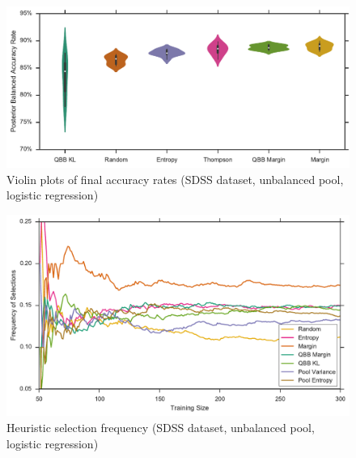 \begin{figure}[p]
	\centering
	\includegraphics[width=\textwidth]{figures/5_active/sdss_ul_ind_violin}
	\caption[Violin plots of final accuracy rates (SDSS, unbalanced, logistic)]{
		Violin plots of final accuracy rates (SDSS dataset, unbalanced pool, logistic regression)}
	\label{fig:sdss_ul_ind_violin}
\end{figure}

\begin{figure}[p]
	\centering
	\includegraphics[width=\textwidth]{figures/5_thompson/sdss_ul_frequencies}
	\caption[Heuristic selection frequency (SDSS, unbalanced, logistic)]{
		Heuristic selection frequency (SDSS dataset, unbalanced pool, logistic regression)}
	\label{fig:sdss_ul_frequencies}
\end{figure}

